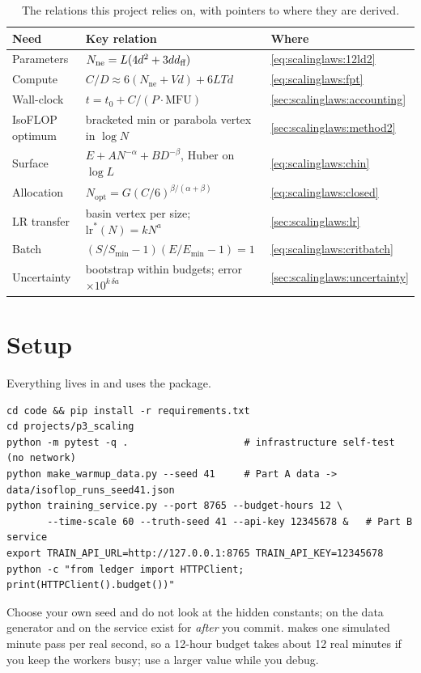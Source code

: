 \begin{table}[h]
\centering\small
\begin{tabularx}{\linewidth}{@{}lXl@{}}
\toprule
\textbf{Need} & \textbf{Key relation} & \textbf{Where}\\
\midrule
Parameters & $N_{\text{ne}} = L(4d^2+3dd_{\text{ff}})$ & \cref{eq:scalinglaws:12ld2}\\
Compute & $C/D \approx 6(N_{\text{ne}}+Vd)+6LTd$ & \cref{eq:scalinglaws:fpt}\\
Wall-clock & $t = t_0 + C/(P\cdot\mathrm{MFU})$ & \cref{sec:scalinglaws:accounting}\\
IsoFLOP optimum & bracketed min or parabola vertex in $\log N$ & \cref{sec:scalinglaws:method2}\\
Surface & $E + A N^{-\alpha} + B D^{-\beta}$, Huber on $\log L$ & \cref{eq:scalinglaws:chin}\\
Allocation & $N_{\text{opt}} = G (C/6)^{\beta/(\alpha+\beta)}$ & \cref{eq:scalinglaws:closed}\\
LR transfer & basin vertex per size; $\text{lr}^*(N) = kN^{a}$ & \cref{sec:scalinglaws:lr}\\
Batch & $(S/S_{\min}-1)(E/E_{\min}-1)=1$ & \cref{eq:scalinglaws:critbatch}\\
Uncertainty & bootstrap within budgets; error $\times10^{k\,\delta a}$ & \cref{sec:scalinglaws:uncertainty}\\
\bottomrule
\end{tabularx}
\caption{The relations this project relies on, with pointers to where they are derived.}
\label{tab:proj3:cheat}
\end{table}

\section{Setup}\label{sec:proj3:setup}

Everything lives in  and uses the  package.
\begin{lstlisting}[style=shell]
cd code && pip install -r requirements.txt
cd projects/p3_scaling
python -m pytest -q .                    # infrastructure self-test (no network)
python make_warmup_data.py --seed 41     # Part A data -> data/isoflop_runs_seed41.json
python training_service.py --port 8765 --budget-hours 12 \
       --time-scale 60 --truth-seed 41 --api-key 12345678 &   # Part B service
export TRAIN_API_URL=http://127.0.0.1:8765 TRAIN_API_KEY=12345678
python -c "from ledger import HTTPClient; print(HTTPClient().budget())"
\end{lstlisting}
Choose your own seed and do not look at the hidden constants;  on the data
generator and \code{GET /score} on the service exist for \emph{after} you commit.
\code{--time-scale 60} makes one simulated minute pass per real second, so a 12-hour budget takes
about 12 real minutes if you keep the workers busy; use a larger value while you debug.

